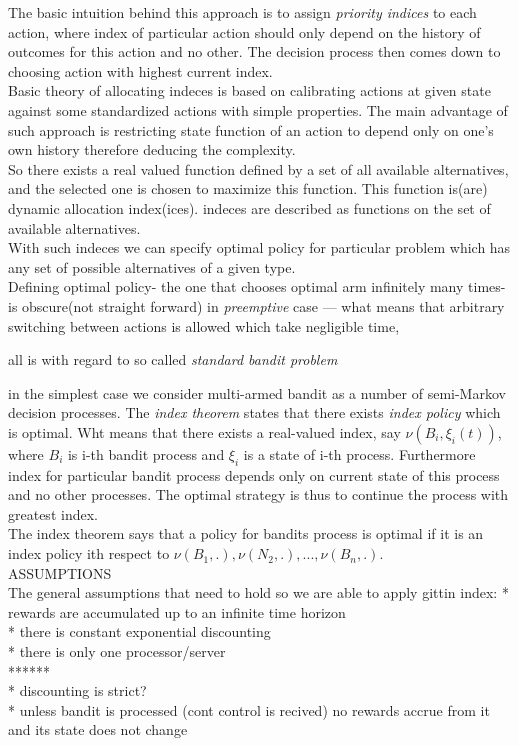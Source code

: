 \documentclass[12pt, a4paper, pdflatex]{report}
\begin{document}
The basic intuition behind this approach is to assign \emph{priority indices} to each action, where index of particular action should only depend on the history of outcomes for this action and no other. The decision process then comes down to choosing action with highest current index.\\

Basic theory of allocating indeces is based on calibrating actions at given state against some standardized actions with simple properties. The main advantage of such approach is restricting state function of an action to depend only on one's own history therefore deducing the complexity.\\

So there exists a real valued function defined by a set of all available alternatives, and the selected one is chosen to maximize this function. This function is(are) dynamic allocation index(ices). indeces are described as functions on the set of available alternatives.\\
With such indeces we can specify optimal policy for particular problem which has any set of possible alternatives of a given type.\\

Defining optimal policy- the one that chooses optimal arm infinitely many times- is obscure(not straight forward) in \emph{preemptive} case --- what means that arbitrary switching between actions is allowed which take negligible time, 

all is with regard to so called \emph{standard bandit problem}

in the simplest case we consider multi-armed bandit as a number of semi-Markov decision processes. The \emph{index theorem} states that there exists \emph{index policy} which is optimal. Wht means that there exists a real-valued index, say $\nu ( B_i , \xi_i(t) )$, where $B_i$ is i-th bandit process and $\xi_i$ is a state of i-th process. Furthermore index for particular bandit process depends only on current state of this process and no other processes. The optimal strategy is thus to continue the process with greatest index.\\

The index theorem says that a policy for bandits process is optimal if it is an index policy ith respect to $\nu(B_1, .), \nu(N_2, .), ... , \nu(B_n, .)$.\\


ASSUMPTIONS\\
The general assumptions that need to hold so we are able to apply gittin index:
* rewards are accumulated up to an infinite time horizon\\
* there is constant exponential discounting\\
* there is only one processor/server\\
******\\
* discounting is strict?\\
* unless bandit is processed (cont control is recived) no rewards accrue from it and its state does not change\\
\end{document}
